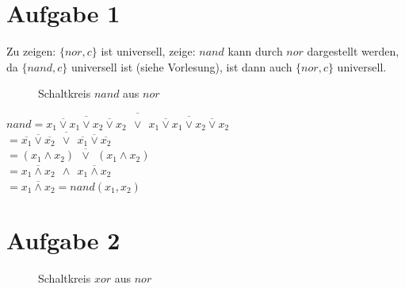 \documentclass[a4paper]{scrartcl}
\begin{document}
\section*{Aufgabe 1}
Zu zeigen: $\{nor, c\}$ ist universell, zeige: $nand$ kann durch $nor$ dargestellt werden, da $\{nand,c\}$ universell ist (siehe Vorlesung), ist dann auch $\{nor, c\}$ universell.

\begin{figure}[htp] 
\caption{Schaltkreis $nand$ aus $nor$}
\end{figure}

$nand = \overline{\overline{\overline{x_1 \vee x_1} \vee \overline{x_2 \vee x_2}}~~\vee ~~\overline{\overline{x_1 \vee x_1} \vee \overline{x_2 \vee x_2}}}$\\
$= \overline{\overline{\overline{x_1} \vee \overline{x_2}}~~\vee ~~\overline{\overline{x_1} \vee \overline{x_2}}}$\\
$= \overline{(x_1 \wedge x_2)~~\vee ~~(x_1 \wedge x_2)}$\\
$= \overline{x_1 \wedge x_2}~~\wedge ~~\overline{x_1 \wedge x_2}$\\
$= \overline{x_1 \wedge x_2} = nand(x_1,x_2)$

\newpage
\section*{Aufgabe 2}

\begin{figure}[htp] 
\caption{Schaltkreis $xor$ aus $nor$}
\end{figure}
\end{document}
